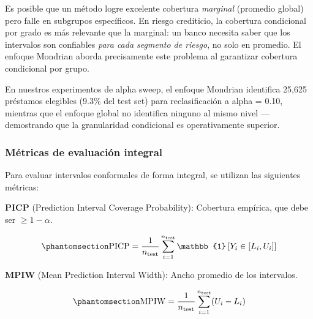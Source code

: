 \documentclass[
  spanish,
  11pt,
  letterpaper,
]{scrbook}
\theoremstyle{plain}
\theoremstyle{remark}
\begin{document}
\begin{tcolorbox}[enhanced jigsaw, arc=.35mm, bottomrule=.15mm, bottomtitle=1mm, breakable, colback=white, colbacktitle=quarto-callout-warning-color!10!white, colframe=quarto-callout-warning-color-frame, coltitle=black, left=2mm, leftrule=.75mm, opacityback=0, opacitybacktitle=0.6, rightrule=.15mm, title=\textcolor{quarto-callout-warning-color}{\faExclamationTriangle}\hspace{0.5em}{Cobertura condicional vs marginal}, titlerule=0mm, toprule=.15mm, toptitle=1mm]

Es posible que un método logre excelente cobertura \emph{marginal}
(promedio global) pero falle en subgrupos específicos. En riesgo
crediticio, la cobertura condicional por grado es más relevante que la
marginal: un banco necesita saber que los intervalos son confiables
\emph{para cada segmento de riesgo}, no solo en promedio. El enfoque
Mondrian aborda precisamente este problema al garantizar cobertura
condicional por grupo.

En nuestros experimentos de alpha sweep, el enfoque Mondrian identifica
25,625 préstamos elegibles (9.3\% del test set) para reclasificación a
alpha = 0.10, mientras que el enfoque global no identifica ninguno al
mismo nivel --- demostrando que la granularidad condicional es
operativamente superior.

\end{tcolorbox}

\subsubsection{Métricas de evaluación
integral}\label{sec-evaluation-metrics}

Para evaluar intervalos conformales de forma integral, se utilizan las
siguientes métricas:

\textbf{PICP} (Prediction Interval Coverage Probability): Cobertura
empírica, que debe ser \(\geq 1 - \alpha\).

\begin{equation}\protect\phantomsection\label{eq-picp}{
\text{PICP} = \frac{1}{n_\text{test}} \sum_{i=1}^{n_\text{test}} \mathbb{1}\left[Y_i \in [L_i, U_i]\right]
}\end{equation}

\textbf{MPIW} (Mean Prediction Interval Width): Ancho promedio de los
intervalos.

\begin{equation}\protect\phantomsection\label{eq-mpiw}{
\text{MPIW} = \frac{1}{n_\text{test}} \sum_{i=1}^{n_\text{test}} (U_i - L_i)
}\end{equation}
\end{document}

